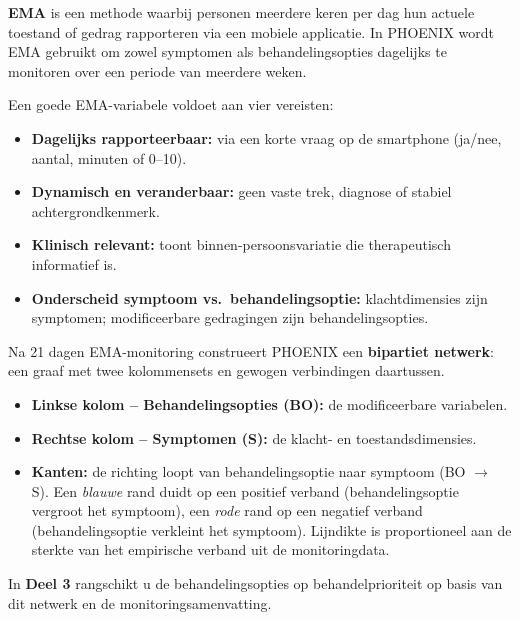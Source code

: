 \documentclass[11pt,a4paper]{article}
\begin{document}
\vspace{0.4em}
\begin{instrbox}[title={Ecological Momentary Assessment (EMA) -- basisprincipes}]
\small
\textbf{EMA} is een methode waarbij personen meerdere keren per dag hun actuele
toestand of gedrag rapporteren via een mobiele applicatie. In PHOENIX wordt EMA
gebruikt om zowel symptomen als behandelingsopties dagelijks te monitoren over een periode
van meerdere weken.

Een goede EMA-variabele voldoet aan vier vereisten:
\begin{itemize}[topsep=2pt,itemsep=1pt]
\item \textbf{Dagelijks rapporteerbaar:} via een korte vraag op de smartphone (ja/nee, aantal, minuten of 0--10).
\item \textbf{Dynamisch en veranderbaar:} geen vaste trek, diagnose of stabiel achtergrondkenmerk.
\item \textbf{Klinisch relevant:} toont binnen-persoonsvariatie die therapeutisch informatief is.
\item \textbf{Onderscheid symptoom vs.\ behandelingsoptie:} klachtdimensies zijn symptomen; modificeerbare gedragingen zijn behandelingsopties.
\end{itemize}
\end{instrbox}

\vspace{0.4em}
\begin{instrbox}[title={Het bipartiet netwerk: structuur van het observatiemodel}]
\small
Na 21 dagen EMA-monitoring construeert PHOENIX een \textbf{bipartiet netwerk}:
een graaf met twee kolommensets en gewogen verbindingen daartussen.
\begin{itemize}[topsep=2pt,itemsep=1pt]
\item \textbf{Linkse kolom -- Behandelingsopties (BO):} de modificeerbare variabelen.
\item \textbf{Rechtse kolom -- Symptomen (S):} de klacht- en toestandsdimensies.
\item \textbf{Kanten:} de richting loopt van behandelingsoptie naar symptoom (BO $\rightarrow$ S).
Een \emph{blauwe} rand duidt op een positief verband (behandelingsoptie vergroot het symptoom),
een \emph{rode} rand op een negatief verband (behandelingsoptie verkleint het symptoom).
Lijndikte is proportioneel aan de sterkte van het empirische verband uit de monitoringdata.
\end{itemize}
In \textbf{Deel 3} rangschikt u de behandelingsopties op behandelprioriteit op basis van
dit netwerk en de monitoringsamenvatting.
\end{instrbox}
\end{document}
